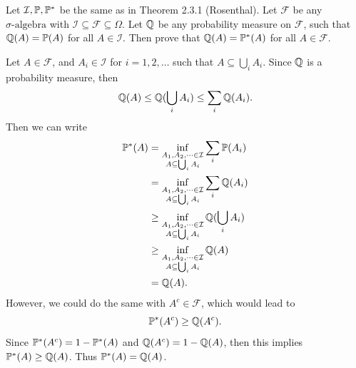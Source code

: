 \begin{problem}
	Let $ \mathcal{I},\mathbb{P}, \mathbb{P}^* $ be the same as in Theorem 2.3.1 (Rosenthal). Let $ \mathcal{F} $ be any $ \sigma\text{-algebra} $ with $ \mathcal{I} \subseteq \mathcal{F} \subseteq \Omega $. Let $ \mathbb{Q} $ be any probability measure on $ \mathcal{F} $, such that $ \mathbb{Q}(A) = \mathbb{P}(A) $ for all $ A \in \mathcal{I} $. Then prove that $ \mathbb{Q}(A) = \mathbb{P}^*(A) $ for all $ A \in \mathcal{F} $.
\end{problem}
\begin{solution}
	Let $ A \in \mathcal{F} $, and $ A_i \in \mathcal{I} $ for $ i=1,2,\dots $ such that $ A \subseteq \bigcup_i A_i $. Since $ \mathbb{Q} $ is a probability measure, then 
	\[ \mathbb{Q}(A) \leq \mathbb{Q}(\bigcup_i A_i) \leq \sum_i \mathbb{Q}(A_i). \]
	Then we can write
	\begin{align*}
		\mathbb{P}^*(A) &= \inf_{\substack{A_1,A_2,\cdots \in \mathcal{I} \\ A \subseteq \bigcup_i A_i}}\sum_i \mathbb{P}(A_i) \\
		&= \inf_{\substack{A_1,A_2,\cdots \in \mathcal{I} \\ A \subseteq \bigcup_i A_i}}\sum_i \mathbb{Q} (A_i) \\
		&\geq \inf_{\substack{A_1,A_2,\cdots \in \mathcal{I} \\ A \subseteq \bigcup_i A_i}}\mathbb{Q}(\bigcup_i A_i)\\
		&\geq \inf_{\substack{A_1,A_2,\cdots \in \mathcal{I} \\ A \subseteq \bigcup_i A_i}}\mathbb{Q}(A)\\
		& = \mathbb{Q}(A).
	\end{align*}
	However, we could do the same with $ A^c \in \mathcal{F} $, which would lead to
	\[ \mathbb{P}^*(A^c) \geq \mathbb{Q}(A^c). \]
	Since $ \mathbb{P}^*(A^c) = 1 - \mathbb{P}^*(A) $ and $ \mathbb{Q}(A^c) = 1 - \mathbb{Q}(A) $, then this implies  $  \mathbb{P}^*(A) \geq \mathbb{Q}(A)  $. Thus $ \mathbb{P}^*(A) = \mathbb{Q}(A) $.
\end{solution}

